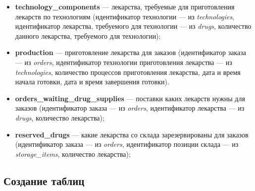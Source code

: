\documentclass[a4paper]{article}
\newcommand{\dbtable}[1]{\textbf{#1}}
\newcommand{\dbtableref}[1]{\textit{#1}}
\begin{document}
\begin{itemize}
				\item \dbtable{technology\_components} --- лекарства, требуемые для приготовления лекарств по технологиям (идентификатор технологии --- из \dbtableref{technologies}, идентификатор лекарства, требуемого для технологии --- из \dbtableref{drugs}, количество данного лекарства, требуемого для технологии);
								
				\item \dbtable{production} --- приготовление лекарства для заказов (идентификатор заказа --- из \dbtableref{orders}, идентификатор технологии приготовления лекарства --- из \dbtableref{technologies}, количество процессов приготовления лекарства, дата и время начала готовки, дата и время завершения готовки).
								
				\item \dbtable{orders\_waiting\_drug\_supplies} --- поставки каких лекарств нужны для заказов (идентификатор заказа --- из \dbtableref{orders}, идентификатор лекарства --- из \dbtableref{drugs}, количество лекарства);
					
				\item \dbtable{reserved\_drugs} --- какие лекарства со склада зарезервированы для заказов (идентификатор заказа --- из \dbtableref{orders}, идентификатор позиции склада --- из \dbtableref{storage\_items}, количество лекарства);
			\end{itemize}
		\subsection{Создание таблиц}
			
\end{document}
